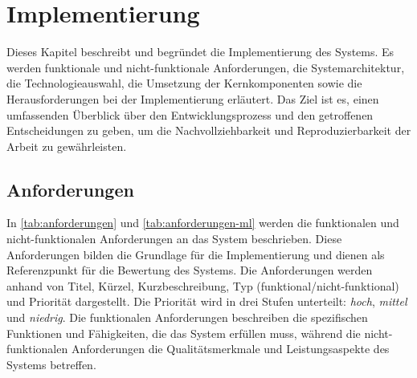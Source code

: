 \chapter{Implementierung}
\label{ch:implementierung}
\thispagestyle{scrheadings}

Dieses Kapitel beschreibt und begründet die Implementierung des Systems. Es werden funktionale und nicht-funktionale Anforderungen, die Systemarchitektur, die Technologieauswahl, die Umsetzung der Kernkomponenten sowie die Herausforderungen bei der Implementierung erläutert. Das Ziel ist es, einen umfassenden Überblick über den Entwicklungsprozess und den getroffenen Entscheidungen zu geben, um die Nachvollziehbarkeit und Reproduzierbarkeit der Arbeit zu gewährleisten.


\section{Anforderungen}
\label{sec:anforderungen}

In \cref{tab:anforderungen} und \cref{tab:anforderungen-ml} werden die funktionalen und nicht-funktionalen Anforderungen an das System beschrieben. Diese Anforderungen bilden die Grundlage für die Implementierung und dienen als Referenzpunkt für die Bewertung des Systems. Die Anforderungen werden anhand von Titel, Kürzel, Kurzbeschreibung, Typ (funktional/nicht-funktional) und Priorität dargestellt. Die Priorität wird in drei Stufen unterteilt: \textit{hoch}, \textit{mittel} und \textit{niedrig}. Die funktionalen Anforderungen beschreiben die spezifischen Funktionen und Fähigkeiten, die das System erfüllen muss, während die nicht-funktionalen Anforderungen die Qualitätsmerkmale und Leistungsaspekte des Systems betreffen.

